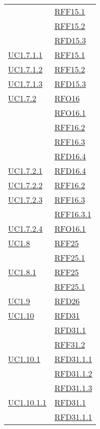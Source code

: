 \begin{longtable}{|>{\centering}m{5cm}|m{5cm}<{\centering}|}
& \hyperlink{RFF15.1}{RFF15.1}\\
& \hyperlink{RFF15.2}{RFF15.2}\\
& \hyperlink{RFD15.3}{RFD15.3}\\ \hline
\hyperref[UC1.7.1.1]{UC1.7.1.1} & \hyperlink{RFF15.1}{RFF15.1}\\ \hline
\hyperref[UC1.7.1.2]{UC1.7.1.2} & \hyperlink{RFF15.2}{RFF15.2}\\ \hline
\hyperref[UC1.7.1.3]{UC1.7.1.3} & \hyperlink{RFD15.3}{RFD15.3}\\ \hline
\hyperref[UC1.7.2]{UC1.7.2} & \hyperlink{RFO16}{RFO16}\\
& \hyperlink{RFO16.1}{RFO16.1}\\
& \hyperlink{RFF16.2}{RFF16.2}\\
& \hyperlink{RFF16.3}{RFF16.3}\\
& \hyperlink{RFD16.4}{RFD16.4}\\ \hline
\hyperref[UC1.7.2.1]{UC1.7.2.1} & \hyperlink{RFD16.4}{RFD16.4}\\ \hline
\hyperref[UC1.7.2.2]{UC1.7.2.2} & \hyperlink{RFF16.2}{RFF16.2}\\ \hline
\hyperref[UC1.7.2.3]{UC1.7.2.3} & \hyperlink{RFF16.3}{RFF16.3}\\
& \hyperlink{RFF16.3.1}{RFF16.3.1}\\ \hline
\hyperref[UC1.7.2.4]{UC1.7.2.4} & \hyperlink{RFO16.1}{RFO16.1}\\ \hline
\hyperref[UC1.8]{UC1.8} & \hyperlink{RFF25}{RFF25}\\
& \hyperlink{RFF25.1}{RFF25.1}\\ \hline
\hyperref[UC1.8.1]{UC1.8.1} & \hyperlink{RFF25}{RFF25}\\
& \hyperlink{RFF25.1}{RFF25.1}\\ \hline
\hyperref[UC1.9]{UC1.9} & \hyperlink{RFD26}{RFD26}\\ \hline
\hyperref[UC1.10]{UC1.10} & \hyperlink{RFD31}{RFD31}\\
& \hyperlink{RFD31.1}{RFD31.1}\\
& \hyperlink{RFF31.2}{RFF31.2}\\ \hline
\hyperref[UC1.10.1]{UC1.10.1} & \hyperlink{RFD31.1.1}{RFD31.1.1}\\
& \hyperlink{RFD31.1.2}{RFD31.1.2}\\
& \hyperlink{RFD31.1.3}{RFD31.1.3}\\ \hline
\hyperref[UC1.10.1.1]{UC1.10.1.1} & \hyperlink{RFD31.1}{RFD31.1}\\
& \hyperlink{RFD31.1.1}{RFD31.1.1}\\ \hline

\end{longtable}
